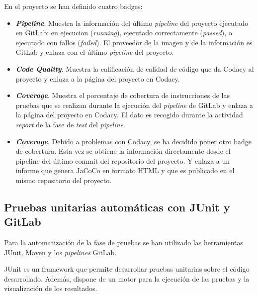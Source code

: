 En el proyecto se han definido cuatro badges:
\begin{itemize}
	\item \textit{\textbf{Pipeline}}. Muestra la información del último \textit{pipeline} del proyecto ejecutado en GitLab: en ejecucion (\textit{running}), ejecutado correctamente (\textit{passed}), o ejecutado con fallos (\textit{failed}). El proveedor de la imagen y de la información es GitLab y enlaza con el último \textit{pipeline} del proyecto.
	
	\item \textit{\textbf{Code Quality}}. Muestra la calificación de calidad de código que da Codacy al proyecto y enlaza a la página del proyecto en Codacy.
	
	\item \textit{\textbf{Coverage}}. Muestra el porcentaje de cobertura de instrucciones de las pruebas que se realizan durante la ejecución del \textit{pipeline} de GitLab y enlaza a la página del proyecto en Codacy. El dato es recogido durante la actividad \textit{report} de la fase de \textit{test} del \textit{pipeline}.
	
	\item \textit{\textbf{Coverage}}. Debido a problemas con Codacy, se ha decidido poner otro badge de cobertura. Esta vez se obtiene la información directamente desde el pipeline del último commit del repositorio del proyecto. Y enlaza a un informe que genera JaCoCo en formato HTML y que es publicado en el mismo repositorio del proyecto.
\end{itemize}

\subsection{Pruebas unitarias automáticas con JUnit y GitLab}

Para la automatización de la fase de pruebas se han utilizado las herramientas JUnit, Maven y los \textit{pipelines} GitLab. 

JUnit es un framework que permite desarrollar pruebas unitarias sobre el código desarrollado. Además, dispone de un motor para la ejecución de las pruebas y la visualización de los resultados.



